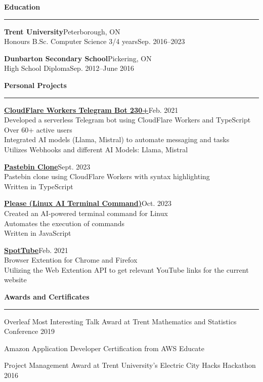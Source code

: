 \documentclass[letterpaper,11pt]{article}
\newcommand{\mysection}[1]{\vspace{5pt} {\bfseries #1} \\ {\color{gray} \rule[5pt]{\textwidth}{1pt}}}
\begin{document}
\mysection{Education}
\begin{description}
    \item \textbf{Trent University}\hfill Peterborough, ON\\
        Honours B.Sc. Computer Science 3/4 years\hfill Sep. 2016–2023
    \item \textbf{Dunbarton Secondary School}\hfill Pickering, ON\\
        High School Diploma\hfill Sep. 2012–June 2016
\end{description}

\mysection{Personal Projects}
\begin{description}
    \item
         \href{https://github.com/codebam/cf-workers-telegram-bot}{\textbf{CloudFlare Workers Telegram Bot  230+}}\hfill Feb. 2021\\
        Developed a serverless Telegram bot using CloudFlare Workers and TypeScript\\
        Over 60+ active users\\
        Integrated AI models (Llama, Mistral) to automate messaging and tasks\\
        Utilizes Webhooks and different AI Models: Llama, Mistral
    \item {} \href{https://github.com/codebam/pastebin-r2}{\textbf{Pastebin Clone}}\hfill Sept. 2023\\
        Pastebin clone using CloudFlare Workers with syntax highlighting\\
        Written in TypeScript
    \item {} \href{https://github.com/codebam/please}{\textbf{Please (Linux AI Terminal Command)}}\hfill Oct. 2023\\
        Created an AI-powered terminal command for Linux\\
        Automates the execution of commands\\
        Written in JavaScript
    \item {} \href{https://github.com/codebam/spottube}{\textbf{SpotTube}}\hfill Feb. 2021\\
        Browser Extention for Chrome and Firefox\\
        Utilizing the Web Extention API to get relevant YouTube links for the current website
\end{description}

\mysection{Awards and Certificates}
\begin{description}
    \item {} Overleaf Most Interesting Talk Award at Trent Mathematics and Statistics Conference 2019
    \item {} Amazon Application Developer Certification from AWS Educate
    \item {} Project Management Award at Trent University's Electric City Hacks Hackathon 2016
\end{description}
\end{document}
